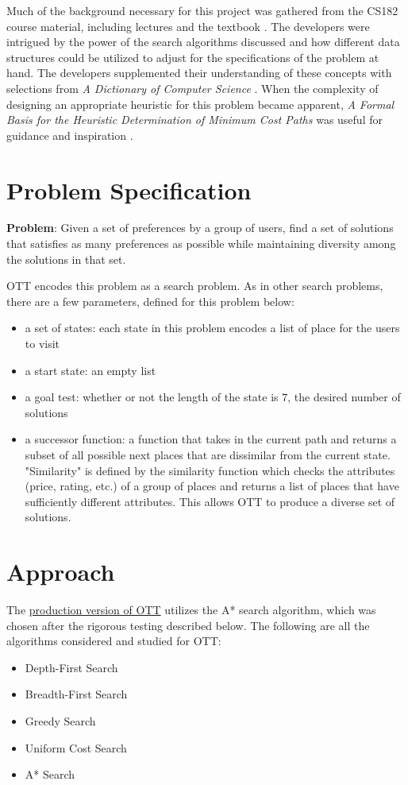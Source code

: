 \documentclass[11pt]{article}
\begin{document}
Much of the background necessary for this project was gathered from the CS182 course material, including lectures and the textbook \cite{astar}. The developers were intrigued by the power of the search algorithms discussed and how different data structures could be utilized to adjust for the specifications of the problem at hand. The developers supplemented their understanding of these concepts with selections from \textit{A Dictionary of Computer Science} \cite{bfs_csdict}. When the complexity of designing an appropriate heuristic for this problem became apparent, \textit{A Formal Basis for the Heuristic Determination of Minimum Cost Paths} was useful for guidance and inspiration \cite{heuristic}.

\section{Problem Specification}

\textbf{Problem}: Given a set of preferences by a group of users, find a set of solutions that satisfies as many preferences as possible while maintaining diversity among the solutions in that set.

OTT encodes this problem as a search problem. As in other search problems, there are a few parameters, defined for this problem below:
\begin{itemize}
    \item a set of states: each state in this problem encodes a list of place for the users to visit
    \item a start state: an empty list
    \item a goal test: whether or not the length of the state is $7$, the desired number of solutions
    \item a successor function: a function that takes in the current path and returns a subset of all possible next places that are dissimilar from the current state. "Similarity" is defined by the similarity function which checks the attributes (price, rating, etc.) of a group of places and returns a list of places that have sufficiently different attributes. This allows OTT to produce a diverse set of solutions.
\end{itemize}

\section{Approach}

The \href{https://github.com/acamara1498/OTT}{production version of OTT} utilizes the A* search algorithm, which was chosen after the rigorous testing described below. The following are all the algorithms considered and studied for OTT:
\begin{itemize}
    \item Depth-First Search
    \item Breadth-First Search
    \item Greedy Search
    \item Uniform Cost Search
    \item A* Search
\end{itemize}
\end{document}
